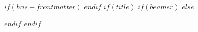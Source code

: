 $if(has-frontmatter)$
\frontmatter
$endif$
$if(title)$
$if(beamer)$
\frame{\titlepage}
$else$
\maketitle
$endif$
$endif$

\thispagestyle{empty}